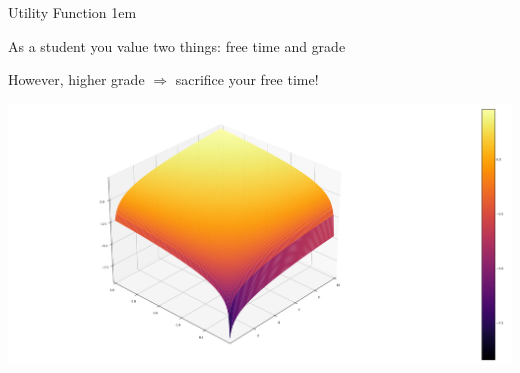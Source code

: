 \documentclass[11pt,aspectratio=43,usenames,dvipsnames]{beamer}
\let\olditemize=\itemize
\let\endolditemize=\enditemize
\renewenvironment{itemize}{\olditemize \itemsep1em}{\endolditemize}
\theoremstyle{definition}
\begin{document}
\begin{frame}[fragile]{Utility Function}
\label{slide:Utility_Function}
    \begin{itemize}
        \item As a student you \alert{value} two things: \alert{free time} and \alert{grade}
        \item However, higher grade $ \Rightarrow  $ sacrifice your free time!
    \end{itemize}

    \begin{center}

        \includegraphics[width=\textwidth]{./figures/utility.png}
    \end{center}

\end{frame}
\end{document}
